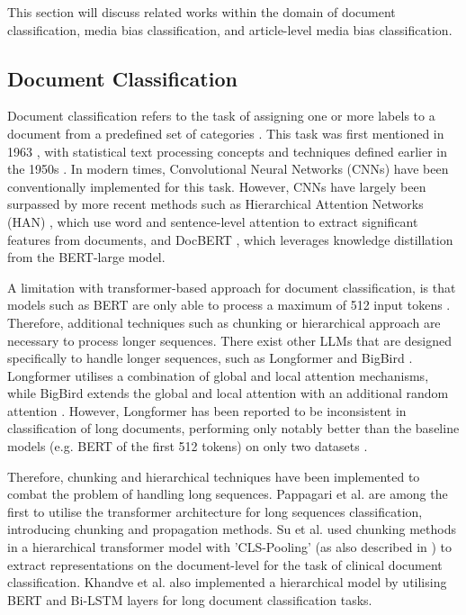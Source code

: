This section will discuss related works within the domain of document classification, media bias classification, and article-level media bias classification.


\subsection{Document Classification}

Document classification refers to the task of assigning one or more labels to a document from a predefined set of categories \cite{wan-2019-long-length}. This task was first mentioned in 1963 \cite{borko-1963-auto-doc-classification}, with statistical text processing concepts and techniques defined earlier in the 1950s \cite{luhn-1958-business-intelligence-system}. In modern times, Convolutional Neural Networks (CNNs) \cite{afzal-deepdocclassifier,liu-2017-xmlcnn} have been conventionally implemented for this task. However, CNNs have largely been surpassed by more recent methods such as Hierarchical Attention Networks (HAN) \cite{yang-2016-han}, which use word and sentence-level attention to extract significant features from documents, and DocBERT \cite{adhikari-2019-docbert}, which leverages knowledge distillation from the BERT-large model.

A limitation with transformer-based approach for document classification, is that models such as BERT are only able to process a maximum of 512 input tokens \cite{devlin-2019-bert}. Therefore, additional techniques such as chunking or hierarchical approach are necessary to process longer sequences. There exist other LLMs that are designed specifically to handle longer sequences, such as Longformer \cite{beltagy-2020-longformer} and BigBird \cite{zaheer-2021-bigbird}. Longformer utilises a combination of global and local attention mechanisms, while BigBird extends the global and local attention with an additional random attention \cite{zaheer-2021-bigbird,beltagy-2020-longformer}. However, Longformer has been reported to be inconsistent in classification of long documents, performing only notably better than the baseline models (e.g. BERT of the first 512 tokens) on only two datasets \cite{park-2022-efficient}.

Therefore, chunking and hierarchical techniques have been implemented to combat the problem of handling long sequences. Pappagari et al. \cite{pappagari-2019-hierarchical} are among the first to utilise the transformer architecture for long sequences classification, introducing chunking and propagation methods. Su et al. \cite{su-2021-classifying} used chunking methods in a hierarchical transformer model with 'CLS-Pooling' (as also described in \cite{adhikari-2019-docbert}) to extract representations on the document-level for the task of clinical document classification. Khandve et al. \cite{khandve-2022-hierarchical-longdoc} also implemented a hierarchical model by utilising BERT and Bi-LSTM layers for long document classification tasks.


